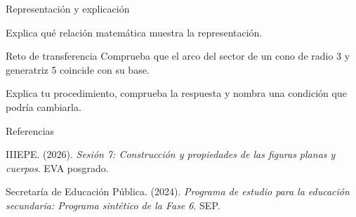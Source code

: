 \documentclass[
	spanish,
	aspectratio=1610,
	xcolor={dvipsnames,table}
]{beamer}
\begin{document}
\begin{frame}{Representación y explicación}
\centering{}\par\vspace{.15cm}\small Explica qué relación matemática muestra la representación.
\end{frame}
\begin{frame}{Reto de transferencia}
\fontsize{14}{18}\selectfont Comprueba que el arco del sector de un cono de radio 3 y generatriz 5 coincide con su base.\par\vspace{.5cm}Explica tu procedimiento, comprueba la respuesta y nombra una condición que podría cambiarla.
\end{frame}
\begin{frame}{Referencias}
\fontsize{9}{11}\selectfont\raggedright 
{\setlength{\parskip}{6pt}
\par\hangindent=1.27cm  IIIEPE. (2026). \textit{Sesión 7: Construcción y propiedades de las figuras planas y cuerpos}. EVA posgrado.
\par\hangindent=1.27cm  Secretaría de Educación Pública. (2024). \textit{Programa de estudio para la educación secundaria: Programa sintético de la Fase 6}. SEP.
}


\end{frame}
\end{document}
